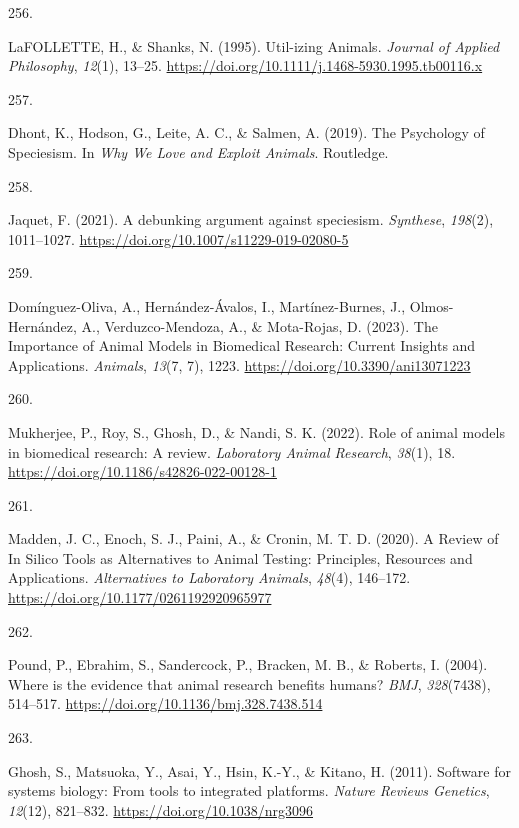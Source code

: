 \documentclass[
  11pt,
  letterpaper,
]{scrreprt}
\newlength{\cslhangindent}
\newlength{\csllabelwidth}
\newenvironment{CSLReferences}[2] %
 {\begin{list}{}{%
  \setlength{\itemindent}{0pt}
  \setlength{\leftmargin}{0pt}
  \setlength{\parsep}{0pt}
  \ifodd #1
   \setlength{\leftmargin}{\cslhangindent}
   \setlength{\itemindent}{-1\cslhangindent}
  \fi
  \setlength{\itemsep}{#2\baselineskip}}}
 {\end{list}}
\newcommand{\CSLLeftMargin}[1]{\parbox[t]{\csllabelwidth}{\strut#1\strut}}
\newcommand{\CSLRightInline}[1]{\parbox[t]{\linewidth - \csllabelwidth}{\strut#1\strut}}
\begin{document}
\begin{CSLReferences}{0}{0}
\CSLLeftMargin{256. }%
\CSLRightInline{LaFOLLETTE, H., \& Shanks, N. (1995). Util-izing
{Animals}. \emph{Journal of Applied Philosophy}, \emph{12}(1), 13--25.
\url{https://doi.org/10.1111/j.1468-5930.1995.tb00116.x}}

\CSLLeftMargin{257. }%
\CSLRightInline{Dhont, K., Hodson, G., Leite, A. C., \& Salmen, A.
(2019). The {Psychology} of {Speciesism}. In \emph{Why {We Love} and
{Exploit Animals}}. Routledge.}

\CSLLeftMargin{258. }%
\CSLRightInline{Jaquet, F. (2021). A debunking argument against
speciesism. \emph{Synthese}, \emph{198}(2), 1011--1027.
\url{https://doi.org/10.1007/s11229-019-02080-5}}

\CSLLeftMargin{259. }%
\CSLRightInline{Domínguez-Oliva, A., Hernández-Ávalos, I.,
Martínez-Burnes, J., Olmos-Hernández, A., Verduzco-Mendoza, A., \&
Mota-Rojas, D. (2023). The {Importance} of {Animal Models} in
{Biomedical Research}: {Current Insights} and {Applications}.
\emph{Animals}, \emph{13}(7, 7), 1223.
\url{https://doi.org/10.3390/ani13071223}}

\CSLLeftMargin{260. }%
\CSLRightInline{Mukherjee, P., Roy, S., Ghosh, D., \& Nandi, S. K.
(2022). Role of animal models in biomedical research: A review.
\emph{Laboratory Animal Research}, \emph{38}(1), 18.
\url{https://doi.org/10.1186/s42826-022-00128-1}}

\CSLLeftMargin{261. }%
\CSLRightInline{Madden, J. C., Enoch, S. J., Paini, A., \& Cronin, M. T.
D. (2020). A {Review} of {In Silico Tools} as {Alternatives} to {Animal
Testing}: {Principles}, {Resources} and {Applications}.
\emph{Alternatives to Laboratory Animals}, \emph{48}(4), 146--172.
\url{https://doi.org/10.1177/0261192920965977}}

\CSLLeftMargin{262. }%
\CSLRightInline{Pound, P., Ebrahim, S., Sandercock, P., Bracken, M. B.,
\& Roberts, I. (2004). Where is the evidence that animal research
benefits humans? \emph{BMJ}, \emph{328}(7438), 514--517.
\url{https://doi.org/10.1136/bmj.328.7438.514}}

\CSLLeftMargin{263. }%
\CSLRightInline{Ghosh, S., Matsuoka, Y., Asai, Y., Hsin, K.-Y., \&
Kitano, H. (2011). Software for systems biology: From tools to
integrated platforms. \emph{Nature Reviews Genetics}, \emph{12}(12),
821--832. \url{https://doi.org/10.1038/nrg3096}}


\end{CSLReferences}
\end{document}
